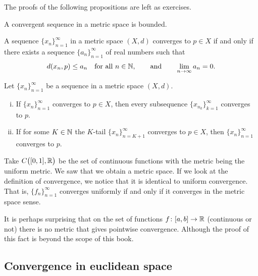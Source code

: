 The proofs of the following propositions are left as exercises.

\begin{prop} \label{prop:msconvbound}
A convergent sequence in a metric space is bounded.
\end{prop}

\begin{prop} \label{prop:msconvifa}
A sequence $\{ x_n \}_{n=1}^\infty$ in a metric space $(X,d)$ converges to $p \in X$
if and only
if there exists a sequence $\{ a_n \}_{n=1}^\infty$ of real numbers such that
\begin{equation*}
d(x_n,p) \leq a_n \quad \text{for all } n \in {\mathbb{N}},
\qquad
\text{and}
\qquad
\lim_{n\to\infty} a_n = 0.
\end{equation*}
\end{prop}

\begin{prop} \label{prop:mssubseq}
Let $\{ x_n \}_{n=1}^\infty$ be a sequence in a metric space $(X,d)$.
\begin{enumerate}[(i)]
\item If $\{ x_n \}_{n=1}^\infty$ converges to $p \in X$, then every
subsequence $\{ x_{n_k} \}_{k=1}^\infty$
converges to $p$.
\item If for some $K \in {\mathbb{N}}$ the $K$-tail $\{ x_n \}_{n=K+1}^\infty$
converges to $p \in X$, then
 $\{ x_n \}_{n=1}^\infty$ converges to $p$.
\end{enumerate}
\end{prop}

\begin{example}
Take $C\bigl([0,1],{\mathbb{R}}\bigr)$ be the set of continuous functions with the metric being
the uniform metric.  We saw that we obtain a metric space.
If we look at the definition of convergence, we notice that it is identical
to uniform convergence.  That is, $\{ f_n \}_{n=1}^\infty$ converges uniformly if and only
if it converges in the metric space sense.
\end{example}

\begin{remark}
It is perhaps surprising that on the set of functions $f \colon [a,b] \to
{\mathbb{R}}$ (continuous or not)
there is no metric that gives pointwise convergence.  Although the proof of
this fact is beyond the scope of this book.
\end{remark}

\subsection{Convergence in euclidean space}

